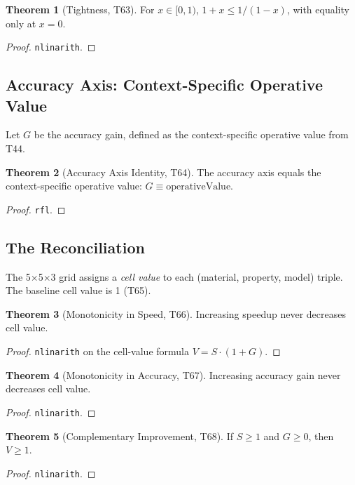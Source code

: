 \documentclass[11pt,a4paper]{article}
\theoremstyle{definition}
\newtheorem{theorem}{Theorem}[section]
\theoremstyle{plain}
\begin{document}
\begin{theorem}[Tightness, T63]
\label{thm:tightness}
For $x \in [0,1)$, $1 + x \leq 1/(1-x)$, with equality only at $x=0$.
\end{theorem}
\begin{proof}
\texttt{nlinarith}.
\end{proof}

\subsection{Accuracy Axis: Context-Specific Operative Value}
\label{subsec:accuracy}

Let $G$ be the accuracy gain, defined as the context-specific operative value from T44.

\begin{theorem}[Accuracy Axis Identity, T64]
\label{thm:accid}
The accuracy axis equals the context-specific operative value: $G \equiv \text{operativeValue}$.
\end{theorem}
\begin{proof}
\texttt{rfl}.
\end{proof}

\subsection{The Reconciliation}
\label{subsec:reconciliation}

The 5$\times$5$\times$3 grid assigns a \emph{cell value} to each (material, property, model) triple. The baseline cell value is 1 (T65).

\begin{theorem}[Monotonicity in Speed, T66]
\label{thm:monospeed}
Increasing speedup never decreases cell value.
\end{theorem}
\begin{proof}
\texttt{nlinarith} on the cell-value formula $V = S \cdot (1 + G)$.
\end{proof}

\begin{theorem}[Monotonicity in Accuracy, T67]
\label{thm:monoacc}
Increasing accuracy gain never decreases cell value.
\end{theorem}
\begin{proof}
\texttt{nlinarith}.
\end{proof}

\begin{theorem}[Complementary Improvement, T68]
\label{thm:complementary}
If $S \geq 1$ and $G \geq 0$, then $V \geq 1$.
\end{theorem}
\begin{proof}
\texttt{nlinarith}.
\end{proof}
\end{document}

